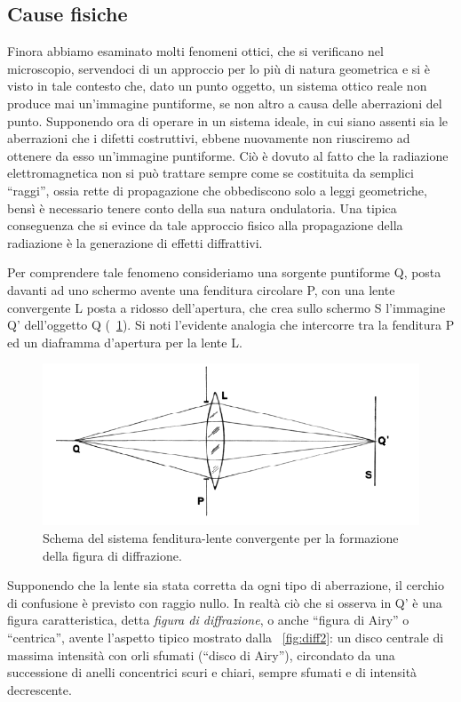 \subsection {Cause fisiche}

Finora abbiamo esaminato molti fenomeni ottici, che si verificano nel microscopio, servendoci di un approccio per lo più di natura geometrica e si è visto in tale contesto che, dato un punto oggetto, un sistema ottico reale non produce mai un'immagine puntiforme, se non altro a causa delle aberrazioni del punto.
Supponendo ora di operare in un sistema ideale, in cui siano assenti sia le aberrazioni che i difetti costruttivi, ebbene nuovamente non riusciremo ad ottenere da esso un'immagine puntiforme. 
Ciò è dovuto al fatto che la radiazione elettromagnetica non si può trattare sempre come se costituita da semplici ``raggi'', ossia rette di propagazione che obbediscono solo a leggi geometriche, bensì è necessario tenere conto della sua natura ondulatoria.
Una tipica conseguenza che si evince da tale approccio fisico alla propagazione della radiazione è la generazione di effetti diffrattivi.

Per comprendere tale fenomeno consideriamo una sorgente puntiforme Q, posta davanti ad uno schermo avente una fenditura circolare P, con una lente convergente L posta a ridosso dell'apertura, che crea sullo schermo S l'immagine Q' dell'oggetto Q (\figurename~\ref{fig:diff}).
Si noti l'evidente analogia che intercorre tra la fenditura P ed un diaframma d'apertura per la lente L.

\begin{figure}
 \centering
 \includegraphics[scale=.55]{img/CAP2diff.png}
 \caption{\small{Schema del sistema fenditura-lente convergente per la formazione della figura di diffrazione.}}
 \label{fig:diff}
\end{figure}

Supponendo che la lente sia stata corretta da ogni tipo di aberrazione, il cerchio di confusione è previsto con raggio nullo. 
In realtà ciò che si osserva in Q' è una figura caratteristica, detta \textit{figura di diffrazione}, o anche ``figura di Airy'' o ``centrica'', avente l'aspetto tipico mostrato dalla \figurename~\ref{fig:diff2}: un disco centrale di massima intensità con orli sfumati (``disco di Airy''), circondato da una successione di anelli concentrici scuri e chiari, sempre sfumati e di intensità decrescente.

